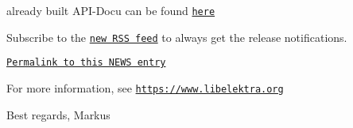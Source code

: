 already built A\+P\+I-\/\+Docu can be found \href{https://doc.libelektra.org/api/0.8.10/html/}{\tt here}

Subscribe to the \href{https://doc.libelektra.org/news/feed.rss}{\tt new R\+SS feed} to always get the release notifications.

\href{https://doc.libelektra.org/news/6ce57ecf-420a-4a31-821e-1c5fe5532eb4.html}{\tt Permalink to this N\+E\+WS entry}

For more information, see \href{https://www.libelektra.org}{\tt https\+://www.\+libelektra.\+org}

Best regards, Markus 